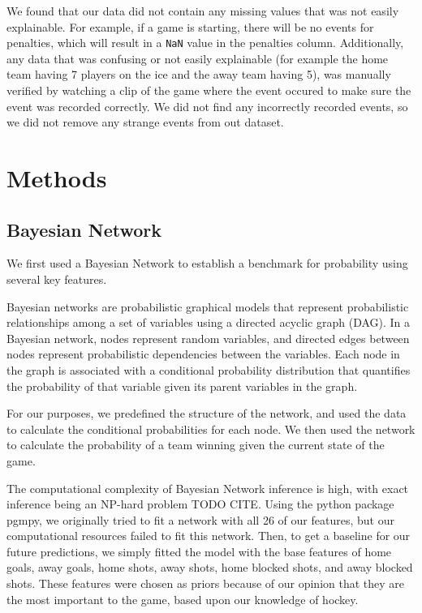 \documentclass[11pt]{article}
\begin{document}
We found that our data did not contain any missing values that was not easily explainable. For example, if a game is starting, there will be no
events for penalties, which will result in a {\tt NaN} value in the penalties column. Additionally, any data that was confusing or not easily explainable
(for example the home team having 7 players on the ice and the away team having 5), was manually verified by watching a clip of the game where
the event occured to make sure the event was recorded correctly. We did not find any incorrectly recorded events, so we 
did not remove any strange events from out dataset.

\section{Methods}

\subsection{Bayesian Network}
We first used a Bayesian Network to establish a benchmark for probability using several key features.

Bayesian networks are probabilistic graphical models that represent probabilistic relationships among a set of variables using a directed acyclic graph (DAG). 
In a Bayesian network, nodes represent random variables, and directed edges between nodes represent probabilistic dependencies between the variables. Each node in the graph is associated with a conditional probability distribution that quantifies the probability of that variable given its parent variables in the graph.

For our purposes, we predefined the structure of the network, and used the data to calculate the conditional probabilities for each node. We then used the network to calculate the probability of a team winning given the current state of the game.

The computational complexity of Bayesian Network inference is high, with exact inference being an NP-hard problem TODO CITE. 
Using the python package pgmpy, we originally tried to fit a network with all 26 of our features, but our computational resources failed to fit this network.
Then, to get a baseline for our future predictions, we simply fitted the model with the base features of home goals, away goals, home shots, away shots, home blocked shots, and away blocked shots. 
These features were chosen as priors because of our opinion that they are the most important to the game, based upon our knowledge of hockey.
\end{document}
